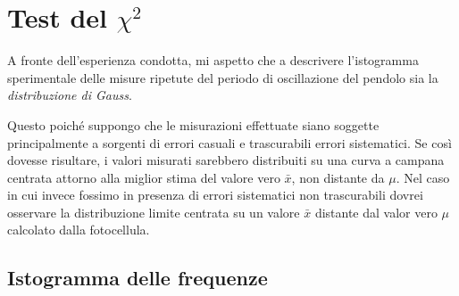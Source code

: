\documentclass{article}
\begin{document}
\section{Test del $\chi^2$}
A fronte dell'esperienza condotta, mi aspetto che a descrivere l'istogramma sperimentale delle misure ripetute del periodo di oscillazione del pendolo sia la \textit{distribuzione di Gauss}.

Questo poiché suppongo che le misurazioni effettuate siano soggette principalmente a sorgenti di errori casuali e trascurabili errori sistematici. Se così dovesse risultare, i valori misurati sarebbero distribuiti su una curva a campana centrata attorno alla miglior stima del valore vero $\bar{x}$, non distante da $\mu$. 
Nel caso in cui invece fossimo in presenza di errori sistematici non trascurabili dovrei osservare la distribuzione limite centrata su un valore $\bar{x}$ distante dal valor vero $\mu$ calcolato dalla fotocellula.

\subsection{Istogramma delle frequenze}

\vspace{0.3cm}
\begin{center}
\end{center}
\vspace{0.2cm}
\end{document}
